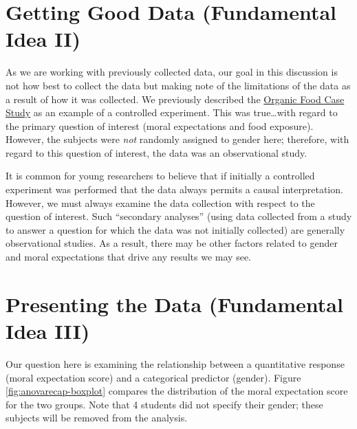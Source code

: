 \documentclass[]{book}
\theoremstyle{definition}
\theoremstyle{definition}
\theoremstyle{remark}
\begin{document}
\section{Getting Good Data (Fundamental Idea
II)}\label{getting-good-data-fundamental-idea-ii-1}

As we are working with previously collected data, our goal in this
discussion is not how best to collect the data but making note of the
limitations of the data as a result of how it was collected. We
previously described the \protect\hyperlink{CaseOrganic}{Organic Food
Case Study} as an example of a controlled experiment. This was
true\ldots{}with regard to the primary question of interest (moral
expectations and food exposure). However, the subjects were \emph{not}
randomly assigned to gender here; therefore, with regard to this
question of interest, the data was an observational study.

It is common for young researchers to believe that if initially a
controlled experiment was performed that the data always permits a
causal interpretation. However, we must always examine the data
collection with respect to the question of interest. Such ``secondary
analyses'' (using data collected from a study to answer a question for
which the data was not initially collected) are generally observational
studies. As a result, there may be other factors related to gender and
moral expectations that drive any results we may see.

\section{Presenting the Data (Fundamental Idea
III)}\label{presenting-the-data-fundamental-idea-iii-1}

Our question here is examining the relationship between a quantitative
response (moral expectation score) and a categorical predictor (gender).
Figure \ref{fig:anovarecap-boxplot} compares the distribution of the
moral expectation score for the two groups. Note that 4 students did not
specify their gender; these subjects will be removed from the analysis.
\end{document}
